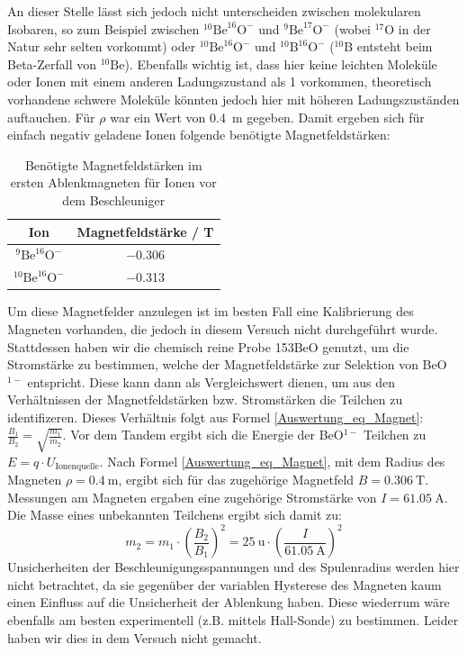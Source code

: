 An dieser Stelle lässt sich jedoch nicht unterscheiden zwischen molekularen Isobaren, so zum Beispiel zwischen $^{10}\text{Be}^{16}\text{O}^{-}$ und $^{9}\text{Be}^{17}\text{O}^{-}$ (wobei $^{17}\text{O}$ in der Natur sehr selten vorkommt) oder $^{10}\text{Be}^{16}\text{O}^{-}$ und $^{10}\text{B}^{16}\text{O}^{-}$ ($^{10}\text{B}$ entsteht beim Beta-Zerfall von $^{10}\text{Be}$).
Ebenfalls wichtig ist, dass hier keine leichten Moleküle oder Ionen mit einem anderen Ladungszustand als 1 vorkommen, theoretisch vorhandene schwere Moleküle könnten jedoch hier mit höheren Ladungszuständen auftauchen.
Für $\rho$ war ein Wert von \SI{0.4}{\metre} gegeben.
Damit ergeben sich für einfach negativ geladene Ionen folgende benötigte Magnetfeldstärken:
\begin{table}[H]
  \centering
  \caption{Benötigte Magnetfeldstärken im ersten Ablenkmagneten für Ionen vor dem Beschleuniger}
  \begin{tabular}{|c|c|}
    \hline
    Ion & Magnetfeldstärke / \si{\tesla} \\
    \hline
    $^{9}\text{Be}^{16}\text{O}^{-}$ & \num{-0.306} \\
    \hline
    $^{10}\text{Be}^{16}\text{O}^{-}$ & \num{-0.313} \\
    \hline
  \end{tabular}
  \label{Auswertung_tab_Ionenenergien_vor_Besch}
\end{table}
Um diese Magnetfelder anzulegen ist im besten Fall eine Kalibrierung des Magneten vorhanden, die jedoch in diesem Versuch nicht durchgeführt wurde.
Stattdessen haben wir die chemisch reine Probe 153BeO genutzt, um die Stromstärke zu bestimmen, welche der Magnetfeldstärke zur Selektion von BeO$^{1-}$ entspricht.
Diese kann dann als Vergleichswert dienen, um aus den Verhältnissen der Magnetfeldstärken bzw. Stromstärken die Teilchen zu identifizeren.
Dieses Verhältnis folgt aus Formel \ref{Auswertung_eq_Magnet}: $\frac{B_1}{B_2} = \sqrt{\frac{m_1}{m_2}}$.
Vor dem Tandem ergibt sich die Energie der BeO$^{1-}$ Teilchen zu $E = q \cdot U_{\text{Ionenquelle}}$.
Nach Formel \ref{Auswertung_eq_Magnet}, mit dem Radius des Magneten $\rho = \SI{0.4}{\metre}$, ergibt sich für das zugehörige Magnetfeld $B = \SI{0.306}{\tesla}$.
Messungen am Magneten ergaben eine zugehörige Stromstärke von $I = \SI{61.05}{\ampere}$.
Die Masse eines unbekannten Teilchens ergibt sich damit zu:
\begin{equation}
    m_2 = m_1 \cdot \left( \frac{B_2}{B_1} \right)^{2} = \SI{25}{\atomicmassunit} \cdot \left (\frac{I}{\SI{61.05}{\ampere}}\right )^{2}
    \label{Auswertung_LE_masse}
\end{equation}
Unsicherheiten der Beschleunigungsspannungen und des Spulenradius werden hier nicht betrachtet, da sie gegenüber der variablen Hysterese des Magneten kaum einen Einfluss auf die Unsicherheit der Ablenkung haben.
Diese wiederrum wäre ebenfalls am besten experimentell (z.B. mittels Hall-Sonde) zu bestimmen.
Leider haben wir dies in dem Versuch nicht gemacht.

